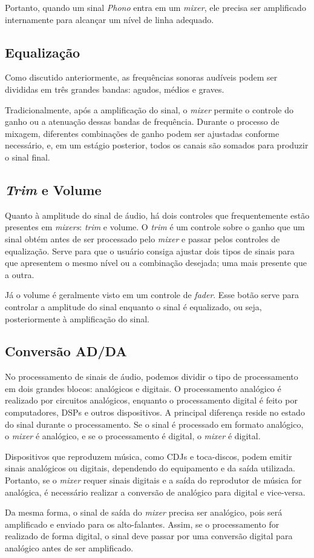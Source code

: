 Portanto, quando um sinal \textit{Phono} entra em um \textit{mixer}, ele precisa ser amplificado internamente para alcançar um nível de linha adequado.

\subsection{Equalização}

Como discutido anteriormente, as frequências sonoras audíveis podem ser divididas em três grandes bandas: agudos, médios e graves. 

Tradicionalmente, após a amplificação do sinal, o \textit{mixer} permite o controle do ganho ou a atenuação dessas bandas de frequência. Durante o processo de mixagem, diferentes combinações de ganho podem ser ajustadas conforme necessário, e, em um estágio posterior, todos os canais são somados para produzir o sinal final.

\subsection{\textit{Trim} e Volume}
Quanto à amplitude do sinal de áudio, há dois controles que frequentemente estão presentes em \textit{mixers}: \textit{trim} e volume. O \textit{trim} é um controle sobre o ganho que um sinal obtém antes de ser processado pelo \textit{mixer} e passar pelos controles de equalização. Serve para que o usuário consiga ajustar dois tipos de sinais para que apresentem o mesmo nível ou a combinação desejada; uma mais presente que a outra.
\par
Já o volume é geralmente visto em um controle de \textit{fader}. Esse botão serve para controlar a amplitude do sinal enquanto o sinal é equalizado, ou seja, posteriormente à amplificação do sinal.

\subsection{Conversão AD/DA}

No processamento de sinais de áudio, podemos dividir o tipo de processamento em dois grandes blocos: analógicos e digitais. O processamento analógico é realizado por circuitos analógicos, enquanto o processamento digital é feito por computadores, DSPs e outros dispositivos. A principal diferença reside no estado do sinal durante o processamento. Se o sinal é processado em formato analógico, o \textit{mixer} é analógico, e se o processamento é digital, o \textit{mixer} é digital.

Dispositivos que reproduzem música, como CDJs e toca-discos, podem emitir sinais analógicos ou digitais, dependendo do equipamento e da saída utilizada. Portanto, se o \textit{mixer} requer sinais digitais e a saída do reprodutor de música for analógica, é necessário realizar a conversão de analógico para digital e vice-versa.

Da mesma forma, o sinal de saída do \textit{mixer} precisa ser analógico, pois será amplificado e enviado para os alto-falantes. Assim, se o processamento for realizado de forma digital, o sinal deve passar por uma conversão digital para analógico antes de ser amplificado.